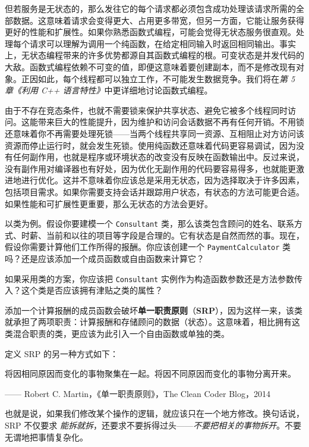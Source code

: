 \label{idx:075}
\label{idx:076}
\label{idx:077}
\label{idx:078}
但若服务是无状态的，那么发往它的每个请求都必须包含成功处理该请求所需的全部数据。这意味着请求会变得更大、占用更多带宽，但另一方面，它能让服务获得更好的性能和扩展性。如果你熟悉函数式编程，可能会觉得无状态服务很直观。处理每个请求可以理解为调用一个纯函数，在给定相同输入时返回相同输出。事实上，无状态编程带来的许多优势都源自其函数式编程的根。可变状态是并发代码的大敌。函数式编程依赖不可变的值，即便这意味着要创建副本，而不是修改现有对象。正因如此，每个线程都可以独立工作，不可能发生数据竞争。我们将在\emph{第 5 章}\emph{《利用 C++ 语言特性》}中更详细地讨论函数式编程。

由于不存在竞态条件，也就不需要锁来保护共享状态、避免它被多个线程同时访问。这能带来巨大的性能提升，因为维护和访问会话数据不再有任何开销。不用锁还意味着你不再需要处理死锁——当两个线程共享同一资源、互相阻止对方访问该资源而停止运行时，就会发生死锁。使用纯函数还意味着代码更容易调试，因为没有任何副作用，也就是程序或环境状态的改变没有反映在函数输出中。反过来说，没有副作用对编译器也有好处，因为优化无副作用的代码要容易得多，也就能更激进地进行优化。这并不意味着你应该总是采用无状态，因为选择取决于许多因素，包括项目需求。如果你需要支持会话并跟踪用户状态，有状态的方法可能更合适。如果性能和可扩展性更重要，那么无状态的方法会更好。

以类为例。假设你要建模一个 \texttt{Consultant} 类，那么该类包含顾问的姓名、联系方式、时薪、当前和以往的项目等字段是合理的。它有状态是自然而然的事。现在，假设你需要计算他们工作所得的报酬。你应该创建一个 \texttt{Payment\allowbreak{}Calculator} 类吗？还是应该添加一个成员函数或自由函数来计算它？

如果采用类的方案，你应该把 \texttt{Consultant} 实例作为构造函数参数还是方法参数传入？这个类是否应该拥有津贴之类的属性？

\label{idx:079}
\label{idx:080}
\label{idx:081}
添加一个计算报酬的成员函数会破坏\textbf{单一职责原则}（\textbf{SRP}），因为这样一来，该类就承担了两项职责：计算报酬和存储顾问的数据（状态）。这意味着，相比拥有这类混合职责的类，更应该为此引入一个自由函数或单独的类。

定义 SRP 的另一种方式如下：

\begin{myQuote}
将因相同原因而变化的事物聚集在一起。将因不同原因而变化的事物分离开来。

—— Robert C. Martin，《单一职责原则》，The Clean Coder Blog，2014

\end{myQuote}

也就是说，如果我们修改某个操作的逻辑，就应该只在一个地方修改。换句话说，SRP 不仅要求 \emph{能拆就拆}，还要求不要拆得过头——\emph{不要把相关的事物拆开}。不要无谓地把事情复杂化。

